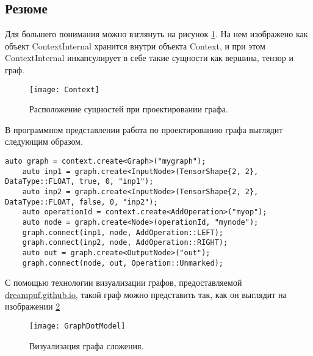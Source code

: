 \subsection{Резюме}
Для большего понимания можно взглянуть на рисунок \ref{Context}. На нем изображено как объект ContextInternal хранится внутри объекта Context, и при этом ContextInternal инкапсулирует в себе такие сущности как вершина, тензор и граф.
\begin{figure}[H]
    \centering
    \texttt{[image: Context]}
    \caption{Расположение сущностей при проектировании графа.}
    \label{Context}
\end{figure}
В программном представлении работа по проектированию графа выглядит следующим образом.
\begin{lstlisting}[caption=Пример построения графа]
    auto graph = context.create<Graph>("mygraph");
    auto inp1 = graph.create<InputNode>(TensorShape{2, 2}, DataType::FLOAT, true, 0, "inp1");
    auto inp2 = graph.create<InputNode>(TensorShape{2, 2}, DataType::FLOAT, false, 0, "inp2");
    auto operationId = context.create<AddOperation>("myop");
    auto node = graph.create<Node>(operationId, "mynode");
    graph.connect(inp1, node, AddOperation::LEFT);
    graph.connect(inp2, node, AddOperation::RIGHT);
    auto out = graph.create<OutputNode>("out");
    graph.connect(node, out, Operation::Unmarked);
\end{lstlisting}
\par
С помощью технологии визуализации графов, предоставляемой \href{https://dreampuf.github.io/GraphvizOnline}{dreampuf.github.io}, такой граф можно представить так, как он выглядит на изображении \ref{GraphDotModel}
\begin{figure}[H]
    \centering
    \texttt{[image: GraphDotModel]}
    \caption{Визуализация графа сложения.}
    \label{GraphDotModel}
\end{figure}